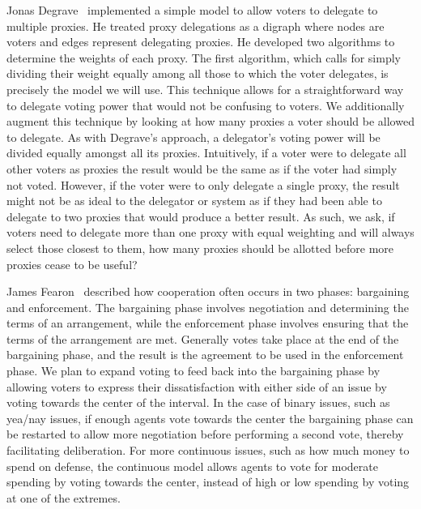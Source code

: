 Jonas Degrave~\cite{Degrave2014} implemented a simple model to allow voters to
delegate to multiple proxies.
He treated proxy delegations as a digraph where nodes are voters and edges represent
delegating proxies.
He developed two algorithms to determine the weights of each proxy.
The first algorithm, which calls for simply dividing their weight equally among all
those to which the voter delegates, is precisely the model we will use.
This technique allows for a straightforward way to delegate voting power that would
not be confusing to voters.
We additionally augment this technique by looking at how many proxies a voter should be
allowed to delegate.
As with Degrave's approach, a delegator's voting power will be divided equally amongst
all its proxies.
Intuitively, if a voter were to delegate all other voters as proxies the result would
be the same as if the voter had simply not voted.
However, if the voter were to only delegate a single proxy, the result might not be
as ideal to the delegator or system as if they had been able to delegate to two proxies
that would produce a better result.
As such, we ask, if voters need to delegate more than one proxy with equal weighting and
will always select those closest to them, how many proxies should be allotted before
more proxies cease to be useful?

James Fearon~\cite{Fearon1998} described how cooperation often occurs in two phases:
bargaining and enforcement.
The bargaining phase involves negotiation and determining the terms of an arrangement,
while the enforcement phase involves ensuring that the terms of the arrangement are met.
Generally votes take place at the end of the bargaining phase, and the result is the
agreement to be used in the enforcement phase.
We plan to expand voting to feed back into the bargaining phase by allowing voters to
express their dissatisfaction with either side of an issue by voting towards the
center of the interval.
In the case of binary issues, such as yea/nay issues, if enough agents vote towards the
center the bargaining phase can be restarted to allow more negotiation before
performing a second vote, thereby facilitating deliberation.
For more continuous issues, such as how much money to spend on defense, the
continuous model allows agents to vote for moderate spending by voting towards the
center, instead of high or low spending by voting at one of the extremes.


